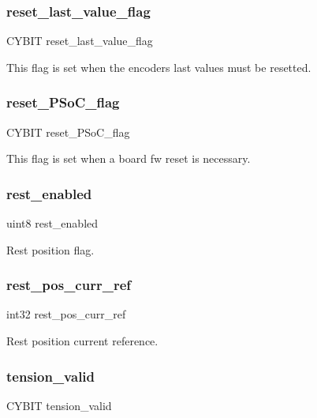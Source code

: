 \subsubsection{reset\+\_\+last\+\_\+value\+\_\+flag}
{\footnotesize\ttfamily C\+Y\+B\+IT reset\+\_\+last\+\_\+value\+\_\+flag}

This flag is set when the encoders last values must be resetted. \mbox{\label{globals_8h_a7f81d1d66186b1c7cd358ea7cfff2caf}} 
\subsubsection{reset\+\_\+\+P\+So\+C\+\_\+flag}
{\footnotesize\ttfamily C\+Y\+B\+IT reset\+\_\+\+P\+So\+C\+\_\+flag}

This flag is set when a board fw reset is necessary. \mbox{\label{globals_8h_a1f8839fadee52a47a0042eaa695c3f3a}} 
\subsubsection{rest\+\_\+enabled}
{\footnotesize\ttfamily uint8 rest\+\_\+enabled}

Rest position flag. \mbox{\label{globals_8h_a485e5b90bbfb79aa97f874873cd6c93a}} 
\subsubsection{rest\+\_\+pos\+\_\+curr\+\_\+ref}
{\footnotesize\ttfamily int32 rest\+\_\+pos\+\_\+curr\+\_\+ref}

Rest position current reference. \mbox{\label{globals_8h_ac42fa606610c2600210d9b7b2c1d0882}} 
\subsubsection{tension\+\_\+valid}
{\footnotesize\ttfamily C\+Y\+B\+IT tension\+\_\+valid}

